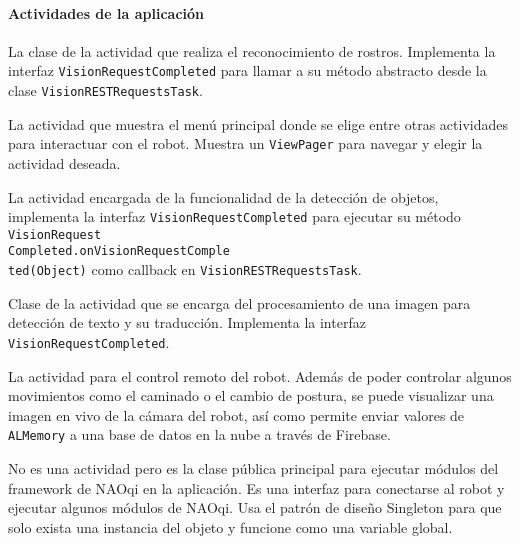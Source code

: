 \paragraph{Actividades de la aplicación}


La clase de la actividad que realiza el reconocimiento de rostros. Implementa la interfaz \texttt{VisionRequestCompleted} para llamar a su método abstracto desde la clase \texttt{VisionRESTRequestsTask}.



La actividad que muestra el menú principal donde se elige entre otras actividades para interactuar con el robot. Muestra un \texttt{ViewPager} para navegar y elegir la actividad deseada.



La actividad encargada de la funcionalidad de la detección de objetos, implementa la interfaz \texttt{VisionRequestCompleted} para ejecutar su método \texttt{VisionRequest\\Completed.onVisionRequestComple\\ted(Object)} como callback en \texttt{VisionRESTRequestsTask}.




Clase de la actividad que se encarga del procesamiento de una imagen 
para detección de texto y su traducción. Implementa la interfaz 
\texttt{VisionRequestCompleted}.


La actividad para el control remoto del robot. Además de poder 
controlar algunos movimientos como el caminado o el cambio de postura, 
se puede visualizar una imagen en vivo de la cámara del robot, así 
como permite enviar valores de \texttt{ALMemory} a una base de datos en la nube 
a través de Firebase.


No es una actividad pero es la clase pública principal para ejecutar módulos del framework de NAOqi en la aplicación. Es una interfaz para conectarse al robot y ejecutar algunos módulos de NAOqi. Usa el patrón de diseño Singleton para que solo exista una instancia del objeto y funcione como una variable global.



